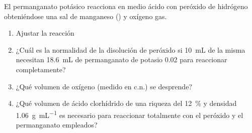 El permanganato potásico reacciona en medio ácido con peróxido de hidrógeno obteniéndose una sal de
manganeso () y oxígeno gas.
\begin{enumerate}[label={\alph*)},font={\color{red!50!black}\bfseries}]
    \item Ajustar la reacción
    \item ¿Cuál es la normalidad de la disolución de peróxido si \SI{10}{\milli\liter} de la misma necesitan \SI{18,6}{\milli\liter} de
    permanganato de potasio \SI{0,02}{\Molar} para reaccionar completamente?
    \item ¿Qué volumen de oxígeno (medido en c.n.) se desprende?
    \item ¿Qué volumen de ácido clorhídrido de una riqueza del \SI{12}{\percent} y densidad \SI{1,06}{\gram\per\milli\liter} es necesario para
    reaccionar totalmente con el peróxido y el permanganato empleados?
\end{enumerate}
